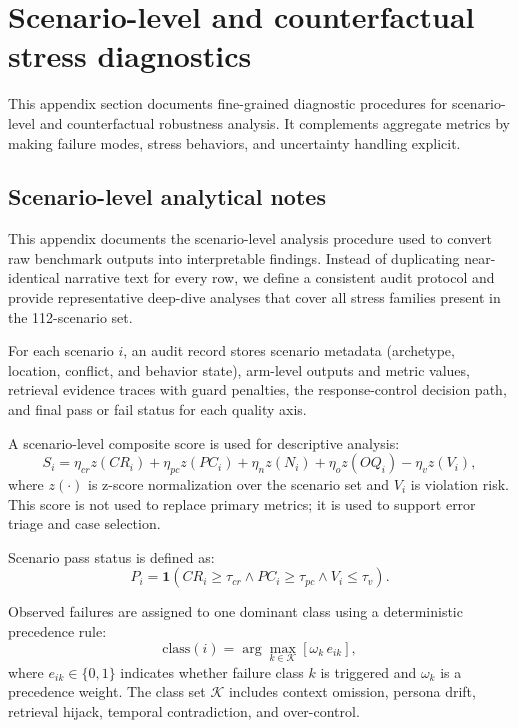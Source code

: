 ﻿\documentclass[a4paper,12pt]{article}
\newcommand{\ind}{\mathbf{1}}
\begin{document}
\section{Scenario-level and counterfactual stress diagnostics}
This appendix section documents fine-grained diagnostic procedures for scenario-level and counterfactual robustness analysis. It complements aggregate metrics by making failure modes, stress behaviors, and uncertainty handling explicit.
\subsection{Scenario-level analytical notes}
This appendix documents the scenario-level analysis procedure used to convert raw benchmark outputs into interpretable findings. Instead of duplicating near-identical narrative text for every row, we define a consistent audit protocol and provide representative deep-dive analyses that cover all stress families present in the 112-scenario set.

For each scenario $i$, an audit record stores scenario metadata (archetype, location, conflict, and behavior state), arm-level outputs and metric values, retrieval evidence traces with guard penalties, the response-control decision path, and final pass or fail status for each quality axis.

A scenario-level composite score is used for descriptive analysis:
\begin{equation}
S_i = \eta_{cr} z(CR_i) + \eta_{pc} z(PC_i) + \eta_n z(N_i) + \eta_o z(OQ_i) - \eta_v z(V_i),
\end{equation}
where $z(\cdot)$ is z-score normalization over the scenario set and $V_i$ is violation risk. This score is not used to replace primary metrics; it is used to support error triage and case selection.

Scenario pass status is defined as:
\begin{equation}
P_i = \ind\!\left(CR_i\ge\tau_{cr} \land PC_i\ge\tau_{pc} \land V_i\le\tau_v\right).
\end{equation}

Observed failures are assigned to one dominant class using a deterministic precedence rule:
\begin{equation}
\text{class}(i)=\arg\max_{k\in\mathcal{K}}\left[\omega_k\,e_{ik}\right],
\end{equation}
where $e_{ik}\in\{0,1\}$ indicates whether failure class $k$ is triggered and $\omega_k$ is a precedence weight. The class set $\mathcal{K}$ includes context omission, persona drift, retrieval hijack, temporal contradiction, and over-control.
\end{document}

